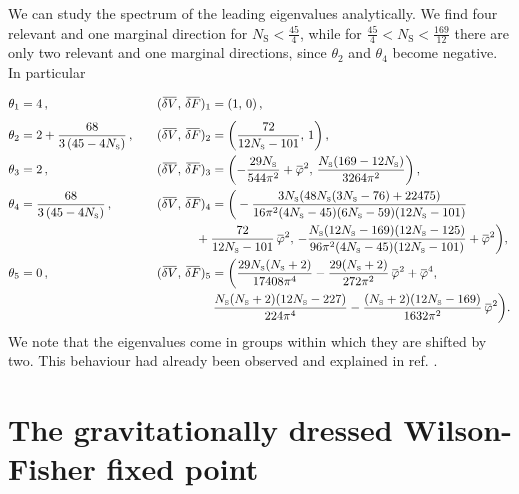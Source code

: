 \documentclass[11pt]{book} %
\newcommand{\overbar}[1]{\mkern 1.5mu\overline{\mkern-1.5mu#1\mkern-1.5mu}\mkern 1.5mu}
\newcommand\NS{ N_{\scriptscriptstyle{\mathrm{S}}} }
\newcommand{\deltaV}{\overbar {\delta V}}
\newcommand{\deltaF}{\overbar {\delta F}}
\newcommand{\bp}{\overbar \varphi}
\numberwithin{equation}{chapter}
\begin{document}
We can study the spectrum of the leading eigenvalues analytically.
We find four relevant and one marginal direction for $\NS<\frac{45}{4}$,
while for $\frac{45}{4}<\NS<\frac{169}{12}$ there are only two relevant and one marginal directions,
since $\theta_2$ and $\theta_4$ become negative. In particular
\begin{alignat}{2}
  \theta_1 &= 4 \,,                                      && (\deltaV, \, \deltaF)_1 = \vphantom{\frac 11} (1, \, 0) \,, \nonumber \\
  \theta_2 &= 2 + \frac{68}{3 \, (45 - 4\NS)} \,, \quad  && (\deltaV, \, \deltaF)_2 = \left( \frac{72}{12 \NS - 101}, \, 1 \right)  , \nonumber\\
  \theta_3 &= 2 \,,                                      && (\deltaV, \, \deltaF)_3 = \left( -\frac{29 \NS}{544\pi^2} + \bp^2, \, \frac{\NS(169 - 12 \NS)}{3264\pi^2}\right) , \nonumber\\
  \theta_4 &=     \frac{68}{3 \, (45 - 4\NS)} \,,        && (\deltaV, \, \deltaF)_4 = \bigg( -\frac{3\NS(48\NS(3 \NS - 76)+22475)}{16\pi^2(4\NS - 45)(6\NS - 59) (12\NS - 101)} \nonumber \\
                                                       & && \hspace{1.1cm} + \frac{72}{12\NS - 101} \, \bp^2, \,  - \frac{\NS(12\NS - 169)(12\NS-125)} {96\pi^2(4\NS - 45)(12 \NS - 101)}+\bp^2\bigg) , \nonumber \\
  \theta_5 &= 0 \,,                                      && (\deltaV, \, \deltaF)_5 = \bigg( \frac{29 \NS (\NS+2)}{17408\pi^4} - \frac{29(\NS+2)}{272\pi ^2} \, \bp^2 + \bp^4, \nonumber \\
                                                       & && \hspace{1.6cm} \frac{\NS (\NS+2) (12 \NS - 227)}{224\pi ^4}-\frac{(\NS+2) (12 \NS - 169) }{1632\pi^2} \, \bp^2 \bigg) .
\end{alignat}
We note that the eigenvalues come in groups
within which they are shifted by two.
This behaviour had already been observed and
explained in ref. \cite{Narain:2009fy}.


\section{The gravitationally dressed Wilson-Fisher fixed point}
\end{document}
